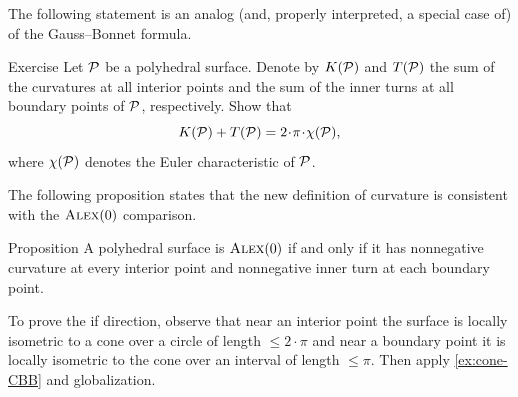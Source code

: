 The following statement is an analog (and, properly interpreted, a special case of) of the Gauss--Bonnet formula.

\begin{thm}{Exercise}\label{ex:gauss-bonnet}
Let $\mathcal{P}$ be a polyhedral surface.
Denote by $K(\mathcal{P})$ and $T(\mathcal{P})$ the sum of the curvatures at all interior points
and the sum of the inner turns at all boundary points of $\mathcal{P}$, respectively.
Show that
\[
K(\spc{P}) + T(\spc{P}) = 2 \cdot \pi \cdot \chi(\spc{P}),
\]
where $\chi(\mathcal{P})$ denotes the Euler characteristic of $\mathcal{P}$.
\end{thm}

The following proposition states that the new definition of curvature is consistent with the $\textup{\textsc{Alex}}(0)$ comparison.

\begin{thm}{Proposition}\label{prop:poly-CBB}
A polyhedral surface is $\textup{\textsc{Alex}}(0)$ if and only if it has nonnegative curvature at every interior point and nonnegative inner turn at each boundary point.
\end{thm}

To prove the if direction, observe that near an interior point the surface is locally isometric to a cone over a circle of length $\le 2\cdot\pi$ and near a boundary point it is locally isometric to the cone over an interval of length $\le \pi$.
Then apply \ref{ex:cone-CBB} and globalization.




